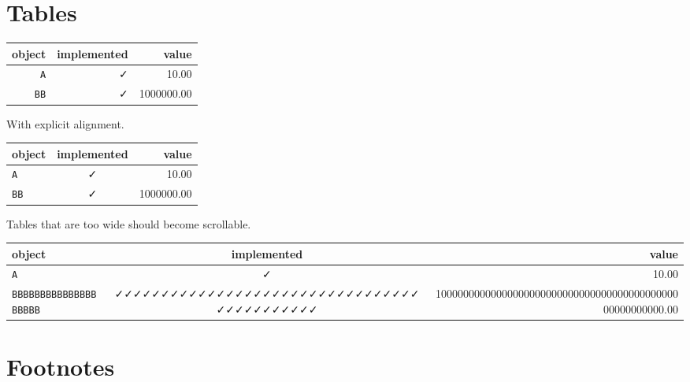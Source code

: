 \section{Tables}



\label{6147076236960597988}{}



\begin{table}[h]
\centering
\begin{tabulary}{\linewidth}{R R R}
\hline
object & implemented & value \\
\hline
\texttt{A} & ✓ & 10.00 \\
\texttt{BB} & ✓ & 1000000.00 \\
\hline
\end{tabulary}

\end{table}



With explicit alignment.




\begin{table}[h]
\centerings
\begin{tabulary}{\linewidth}{L C R}
\hline
object & implemented & value \\
\hline
\texttt{A} & ✓ & 10.00 \\
\texttt{BB} & ✓ & 1000000.00 \\
\hline
\end{tabulary}

\end{table}



Tables that are too wide should become scrollable.




\begin{table}[h]
\centering
\begin{tabulary}{\linewidth}{L C R}
\hline
object & implemented & value \\
\hline
\texttt{A} & ✓ & 10.00 \\
\texttt{BBBBBBBBBBBBBBBBBBBB} & ✓✓✓✓✓✓✓✓✓✓✓✓✓✓✓✓✓✓✓✓✓✓✓✓✓✓✓✓✓✓✓✓✓✓✓✓✓✓✓✓✓✓✓✓ & 1000000000000000000000000000000000000000000000000000000.00 \\
\hline
\end{tabulary}

\end{table}



\section{Footnotes}




